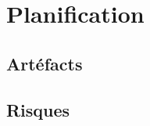 \section{Planification} %
\label{sec:Planification}


\subsection{Artéfacts} %
\label{sub:artefacts}

\subsection{Risques} %
\label{sub:Risques}


